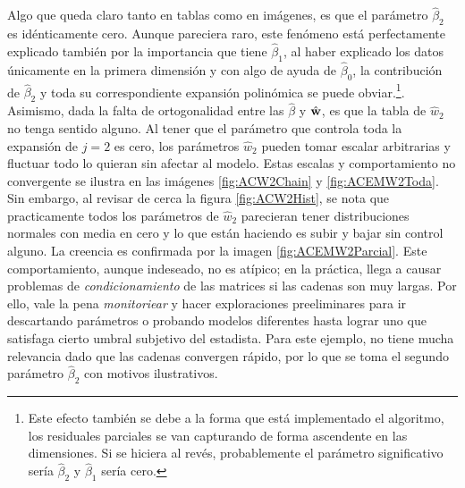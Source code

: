 \documentclass[../Main/Main.tex]{subfiles}
\begin{document}
Algo que queda claro tanto en tablas como en imágenes, es que el parámetro $\hat{\beta}_2$ es idénticamente cero. Aunque pareciera raro, este fenómeno está perfectamente explicado también por la importancia que tiene $\hat{\beta}_1$, al haber explicado los datos únicamente en la primera dimensión y con algo de ayuda de $\hat{\beta}_0$, la contribución de $\hat{\beta}_2$ y toda su correspondiente expansión polinómica se puede obviar.\footnote{Este efecto también se debe a la forma que está implementado el algoritmo, los residuales parciales se van capturando de forma ascendente en las dimensiones. Si se hiciera al revés, probablemente el parámetro significativo sería $\hat{\beta}_2$ y $\hat{\beta}_1$ sería cero.}. Asimismo, dada la falta de ortogonalidad entre las $\hat{\beta}$ y $\hat{\mathbf{w}}$, es que la tabla de $\hat{w}_2$ no tenga sentido alguno. Al tener que el parámetro que controla toda la expansión de $j = 2$ es cero, los parámetros $\hat{w}_2$ pueden tomar escalar arbitrarias y fluctuar todo lo quieran sin afectar al modelo. Estas escalas y comportamiento no convergente se ilustra en las imágenes \ref{fig:ACW2Chain} y \ref{fig:ACEMW2Toda}. Sin embargo, al revisar de cerca la figura \ref{fig:ACW2Hist}, se nota que practicamente todos los parámetros de $\hat{w}_2$ parecieran tener distribuciones normales con media en cero y lo que están haciendo es subir y bajar sin control alguno. La creencia es confirmada por la imagen \ref{fig:ACEMW2Parcial}. Este comportamiento, aunque indeseado, no es atípico; en la práctica, llega a causar problemas de \textit{condicionamiento} de las matrices si las cadenas son muy largas. Por ello, vale la pena \textit{monitoriear} y hacer exploraciones preeliminares para ir descartando parámetros o probando modelos diferentes hasta lograr uno que satisfaga cierto umbral subjetivo del estadista. Para este ejemplo, no tiene mucha relevancia dado que las cadenas convergen rápido, por lo que se toma el segundo parámetro $\hat{\beta}_2$ con motivos ilustrativos.
\end{document}
